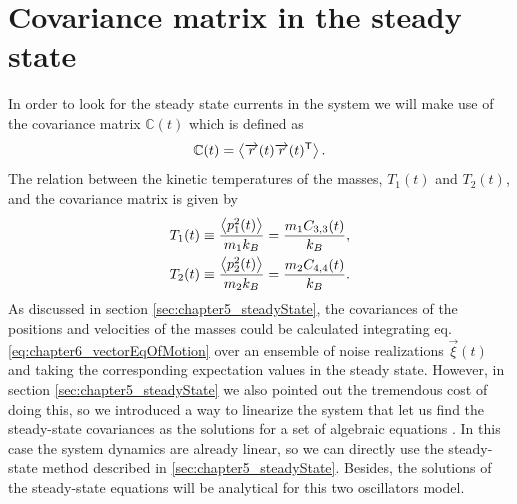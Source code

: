 \section{Covariance matrix in the steady state\label{sec:covMatrix}}
%
%
%
%
%
%
In order to look for the steady state currents in the system we will make use of the covariance matrix $\mathbb{C}(t)$ which is defined as
%
\begin{equation}
\mathbb{C}(t) = \expval{\overrightarrow{r}(t)\overrightarrow{r}(t)^\mathsf{T}}.
\end{equation}
%
The relation between the kinetic temperatures of the masses, $T_1(t)$ and  $T_2(t)$, and the covariance matrix is given by
%
\begin{align}
  T_1(t) &\equiv \frac{\expval{ p_1^2(t)}}{m_1 k_B} = \frac{m_1 C_{3,3}(t)}{k_B},
  \nonumber\\
   T_2(t) &\equiv \frac{\expval{ p_2^2(t)}}{m_2 k_B} = \frac{m_2 C_{4,4}(t)}{k_B}.
  \label{eq:chapter6_Temperature_definition}
\end{align}
%
As discussed in section \ref{sec:chapter5_steadyState}, the covariances of the positions and velocities of the masses could be calculated integrating eq. \eqref{eq:chapter6_vectorEqOfMotion} over an ensemble of noise realizations $\overrightarrow{\xi}(t)$ and taking the corresponding expectation values in the steady state. However, in section \ref{sec:chapter5_steadyState} we also pointed out the tremendous cost of doing this, so we introduced a way to linearize the system that let us find the steady-state covariances as the solutions for a set of algebraic equations \cite{Sarkka2019,Rieder1967,Casher1971}. In this case the system dynamics are already linear, so we can directly use the steady-state method described in \ref{sec:chapter5_steadyState}. Besides, the solutions of the steady-state equations will be analytical for this two oscillators model.

